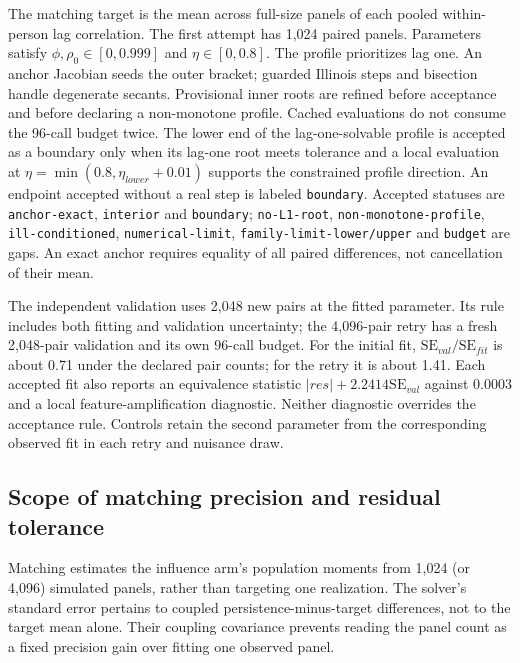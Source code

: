 The matching target is the mean across full-size panels of each pooled within-person lag correlation. The first attempt has 1,024 paired panels. Parameters satisfy $\phi,\rho_0\in[0,0.999]$ and $\eta\in[0,0.8]$. The profile prioritizes lag one. An anchor Jacobian seeds the outer bracket; guarded Illinois steps and bisection handle degenerate secants. Provisional inner roots are refined before acceptance and before declaring a non-monotone profile. Cached evaluations do not consume the 96-call budget twice. The lower end of the lag-one-solvable profile is accepted as a boundary only when its lag-one root meets tolerance and a local evaluation at $\eta=\min(0.8,\eta_{lower}+0.01)$ supports the constrained profile direction. An endpoint accepted without a real step is labeled \texttt{boundary}. Accepted statuses are \texttt{anchor-exact}, \texttt{interior} and \texttt{boundary}; \texttt{no-L1-root}, \texttt{non-monotone-profile}, \texttt{ill-conditioned}, \texttt{numerical-limit}, \texttt{family-limit-lower/upper} and \texttt{budget} are gaps. An exact anchor requires equality of all paired differences, not cancellation of their mean.

The independent validation uses 2,048 new pairs at the fitted parameter. Its rule includes both fitting and validation uncertainty; the 4,096-pair retry has a fresh 2,048-pair validation and its own 96-call budget. For the initial fit, $\mathrm{SE}_{val}/\mathrm{SE}_{fit}$ is about 0.71 under the declared pair counts; for the retry it is about 1.41. Each accepted fit also reports an equivalence statistic $|res|+2.2414\mathrm{SE}_{val}$ against 0.0003 and a local feature-amplification diagnostic. Neither diagnostic overrides the acceptance rule. Controls retain the second parameter from the corresponding observed fit in each retry and nuisance draw.

\subsection{Scope of matching precision and residual tolerance}\label{sec:dd-matching-scope}\label{supp:matching-scope}

Matching estimates the influence arm's population moments from 1,024 (or 4,096) simulated panels, rather than targeting one realization. The solver's standard error pertains to coupled persistence-minus-target differences, not to the target mean alone. Their coupling covariance prevents reading the panel count as a fixed precision gain over fitting one observed panel.

